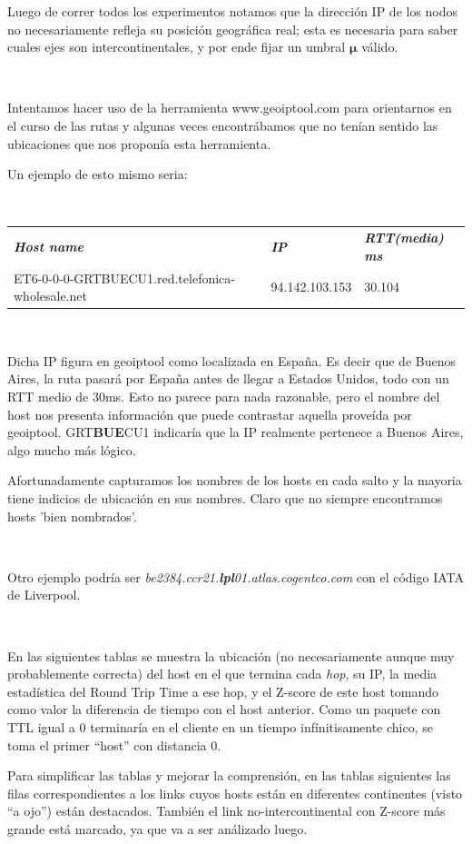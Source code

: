 Luego de correr todos los experimentos notamos que la direcci\'on IP de los nodos
no necesariamente refleja su posici\'on geogr\'afica real; esta es necesaria para
saber cuales ejes son intercontinentales, y por ende fijar un umbral $\bm{\mu}$ v\'alido.

~

Intentamos hacer uso de la herramienta www.geoiptool.com para orientarnos en
el curso de las rutas y algunas veces encontr\'abamos que no ten\'ian sentido las
ubicaciones que nos propon\'ia esta herramienta.

Un ejemplo de esto mismo seria:

~

\begin{tabular}{lll}
	\textit{\textbf{Host name}}	&	\textit{\textbf{IP}}	&	\textit{\textbf{RTT(media) ms}}	\\
	ET6-0-0-0-GRTBUECU1.red.telefonica-wholesale.net	&	94.142.103.153	&	30.104	\\
\end{tabular}

~

Dicha IP figura en geoiptool como localizada en Espa\~na. Es decir que de Buenos Aires, la ruta
pasar\'a por Espa\~na antes de llegar a Estados Unidos,
todo con un RTT medio de 30ms. Esto no parece para nada razonable, pero el nombre del host nos presenta informaci\'on que puede contrastar aquella
prove\'ida por geoiptool. GRT\textbf{BUE}CU1 indicar\'ia que la IP realmente pertenece a Buenos Aires, algo mucho m\'as l\'ogico.

Afortunadamente capturamos los nombres de los hosts en cada salto y la mayoria tiene indicios de ubicaci\'on en sus
nombres. Claro que no siempre encontramos hosts 'bien nombrados'.

~

Otro ejemplo podr\'ia ser \emph{be2384.ccr21.\textbf{lpl}01.atlas.cogentco.com} con el c\'odigo IATA de
Liverpool.

~

En las siguientes tablas se muestra la ubicaci\'on (no necesariamente aunque muy probablemente
correcta) del host en el que termina cada \textit{hop}, su IP, la media estad\'istica del Round Trip
Time a ese hop, y el Z-score de este host tomando como valor la diferencia de
tiempo con el host anterior. Como un paquete con TTL igual a 0 terminar\'ia en el cliente en un
tiempo inf\'initisamente chico, se toma el primer ``host'' con distancia 0.

Para simplificar las tablas y mejorar la comprensi\'on, en las tablas siguientes las filas correspondientes
a los links cuyos hosts est\'an en diferentes continentes (visto ``a ojo'') est\'an destacados.
Tambi\'en el link no-intercontinental con Z-score m\'as grande est\'a marcado, ya que va a ser
an\'alizado luego.

